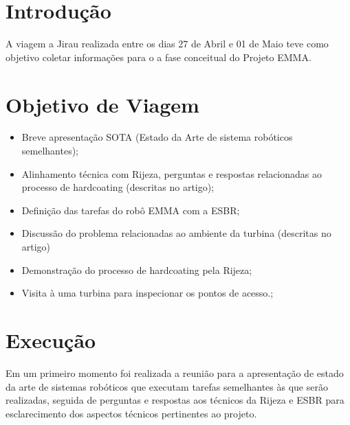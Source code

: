 \documentclass[a4paper,11pt,oneside,openany,brazilian,version=last,draft=false,]{main}
\begin{document}

\begin{twocolumn}




\section{Introdução}
A viagem a Jirau realizada entre os dias 27 de Abril e 01 de Maio teve como
objetivo coletar informações para o a fase conceitual do Projeto EMMA. 

\section{Objetivo de Viagem}
\begin{itemize}
  \item Breve apresentação SOTA (Estado da Arte de sistema robóticos
  seme\-lhantes);
  \item Alinhamento técnica com Rijeza, perguntas e respostas relacionadas ao
  processo de hardcoating (descritas no artigo);
\item Definição das tarefas do robô EMMA com a ESBR;
\item Discussão do problema relacionadas ao ambiente da turbina (descritas no
artigo) 
\item Demonstração do processo de hardcoating pela Rijeza;
\item Visita à uma turbina para inspecionar os pontos de acesso.;
\end{itemize}


\section{Execução}
Em um primeiro momento foi realizada a reunião para a apresentação de estado da
arte de sistemas robóticos que executam tarefas semelhantes às que serão
realizadas, seguida de perguntas e respostas aos técnicos da Rijeza e ESBR para
esclarecimento dos aspectos técnicos pertinentes ao projeto.


\end{twocolumn}
\end{document}
